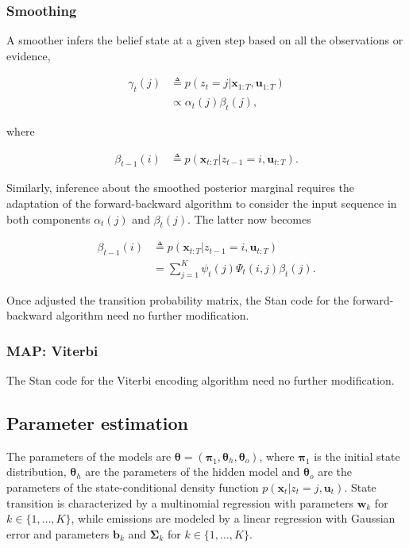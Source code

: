 \documentclass[]{article}
\newcommand{\mat}[1]{\mathbf{#1}}
\begin{document}
{{{\subsubsection{Smoothing}\label{smoothing-1}

A smoother infers the belief state at a given step based on all the
observations or evidence,

\begin{align*}
\gamma_t(j)
  & \triangleq p(z_t = j | \mat{x}_{1:T}, \mat{u}_{1:T}) \\
  & \propto \alpha_t(j) \beta_t(j),
\end{align*}

where

\begin{align*}
\beta_{t-1}(i)
  & \triangleq p(\mat{x}_{t:T} | z_{t-1} = i, \mat{u}_{t:T}).
\end{align*}

Similarly, inference about the smoothed posterior marginal requires the
adaptation of the forward-backward algorithm to consider the input
sequence in both components \(\alpha_t(j)\) and \(\beta_t(j)\). The
latter now becomes

\begin{align*}
\beta_{t-1}(i)
  & \triangleq p(\mat{x}_{t:T} | z_{t-1} = i, \mat{u}_{t:T}) \\
  & = \sum_{j = 1}^{K}{\psi_t(j) \Psi_t(i, j) \beta_{t}(j)}.
\end{align*}

Once adjusted the transition probability matrix, the Stan code for the
forward-backward algorithm need no further modification.

\subsubsection{MAP: Viterbi}\label{map-viterbi-1}

The Stan code for the Viterbi encoding algorithm need no further
modification.

\subsection{Parameter estimation}\label{parameter-estimation-1}

The parameters of the models are
\(\mat{\theta} = (\mat{\pi}_1, \mat{\theta}_h, \mat{\theta}_o)\), where
\(\mat{\pi}_1\) is the initial state distribution, \(\mat{\theta}_h\)
are the parameters of the hidden model and \(\mat{\theta}_o\) are the
parameters of the state-conditional density function
\(p(\mat{x}_t | z_t = j, \mat{u}_t)\). State transition is characterized
by a multinomial regression with parameters \(\mat{w}_k\) for
\(k \in \{1, \dots, K\}\), while emissions are modeled by a linear
regression with Gaussian error and parameters \(\mat{b}_k\) and
\(\mat{\Sigma}_k\) for \(k \in \{1, \dots, K\}\).

}}}
\end{document}
